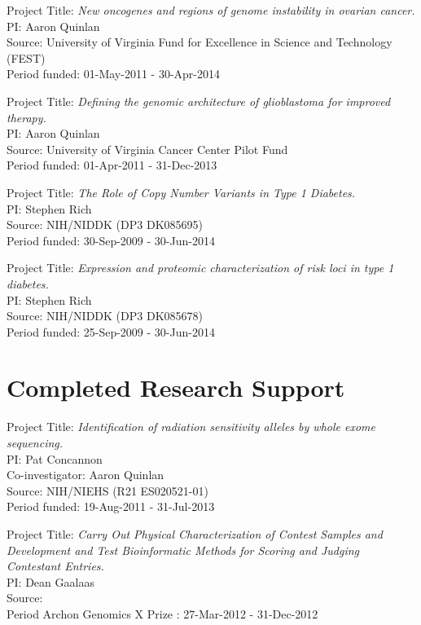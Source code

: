 \documentclass[margin,line]{cv}
\begin{document}
\begin{resume}
    \vspace{-2mm}
    Project Title: \textit{New oncogenes and regions of genome instability in ovarian cancer.} \\
    PI: Aaron Quinlan \\
    Source: University of Virginia Fund for Excellence in Science and Technology (FEST) \\
    Period funded: 01-May-2011 - 30-Apr-2014
    
    \vspace{-2mm}
    Project Title: \textit{Defining the genomic architecture of glioblastoma for improved therapy.} \\
    PI: Aaron Quinlan \\
    Source: University of Virginia Cancer Center Pilot Fund\\
    Period funded: 01-Apr-2011 - 31-Dec-2013

    \vspace{-2mm}
    Project Title: \textit{The Role of Copy Number Variants in Type 1 Diabetes.} \\
    PI: Stephen Rich \\
    Source: NIH/NIDDK (DP3 DK085695)\\
    Period funded: 30-Sep-2009 - 30-Jun-2014

    \vspace{-2mm}
    Project Title: \textit{Expression and proteomic characterization of risk loci in type 1 diabetes.} \\
    PI: Stephen Rich \\
    Source: NIH/NIDDK (DP3 DK085678)\\
    Period funded: 25-Sep-2009 - 30-Jun-2014


    \section{\mysidestyle Completed Research Support}

    Project Title: \textit{Identification of radiation sensitivity alleles by whole exome sequencing.} \\
    PI: Pat Concannon \\
    Co-investigator: Aaron Quinlan \\
    Source: NIH/NIEHS (R21 ES020521-01) \\
    Period funded: 19-Aug-2011 - 31-Jul-2013
    
    \vspace{-2mm}
    Project Title: \textit{Carry Out Physical Characterization of Contest Samples and Development and Test Bioinformatic Methods for Scoring and Judging Contestant Entries.}\\
    PI: Dean Gaalaas\\
    Source: \\
    Period Archon Genomics X Prize : 27-Mar-2012 - 31-Dec-2012


\end{resume}
\end{document}
